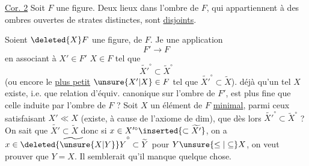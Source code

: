 \uline{Cor. 2} Soit $F$ une figure. Deux lieux dans  l'ombre de $F$, qui appartiennent à des ombres ouvertes de strates distinctes, sont \uline{disjoints}.

Soient $\deleted{X}F$ une figure,   de $F$. Je   une application
\[
 F'\longrightarrow F
\]
en associant à  $X'\in F'$  $X\in F$ tel que
\[
 \widetilde{X'}^\circ\subset\widetilde X^\circ
\]
(ou encore le \uline{plus petit}  $\unsure{X'|X}\in F$ tel que $\widetilde{X'}^\circ\subset\widetilde X$).  déjà qu'un tel $X$ existe, i.e. que  relation d'équiv. canonique sur l'ombre de $F'$, est plus fine que celle induite par l'ombre de $F$ ? Soit $X$ un élément de $F$ \uline{minimal}, parmi ceux satisfaisant $X'\ll X$ (existe, à cause de l'axiome de dim),  que dès lors $\widetilde{X'}^\circ\subset\widetilde X^\circ$ ?  On sait que $\widetilde{X'}\subset\widetilde X$ donc si $x\in X'^\circ\inserted{\subset\widetilde{X'}}$, on a $x\in\widetilde{\deleted{\unsure{X|Y}}Y}^\circ\subset\widetilde Y$ pour $Y\unsure{\leq|\subseteq}X$, on veut prouver que $Y=X$. Il semblerait qu'il manque quelque chose.
